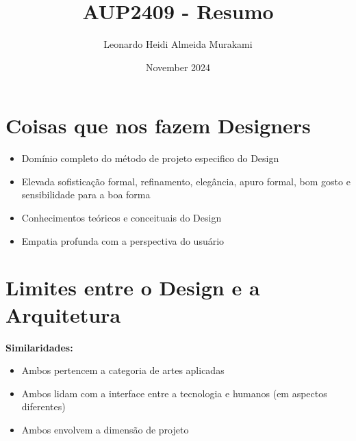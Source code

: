 \documentclass{article}
\title{AUP2409 - Resumo}
\author{Leonardo Heidi Almeida Murakami}
\date{November 2024}
\begin{document}
\maketitle
\newpage

\tableofcontents
\newpage

\section{Coisas que nos fazem Designers}

\begin{itemize}
    \item Domínio completo do método de projeto especifico do Design
    \item Elevada sofisticação formal, refinamento, elegância, apuro formal, bom gosto e sensibilidade para a boa forma
    \item Conhecimentos teóricos e conceituais do Design
    \item Empatia profunda com a perspectiva do usuário
\end{itemize}

\newpage
\section{Limites entre o Design e a Arquitetura}

\textbf{Similaridades:}
\begin{itemize}
    \item Ambos pertencem a categoria de artes aplicadas
    \item Ambos lidam com a interface entre a tecnologia e humanos (em aspectos diferentes)
    \item Ambos envolvem a dimensão de projeto
\end{itemize}
\end{document}

